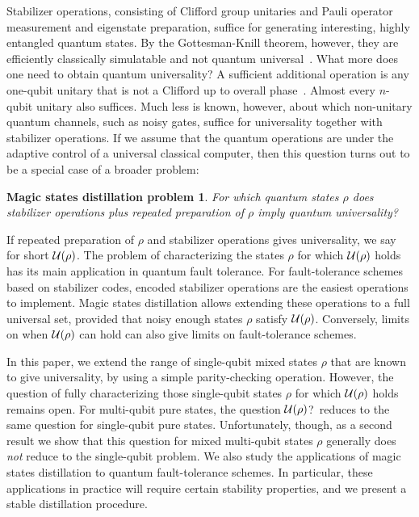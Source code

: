 \documentclass[11pt]{article}
\theoremstyle{note}
\begin{document}
Stabilizer operations, consisting of Clifford group unitaries and Pauli operator measurement and eigenstate preparation, suffice for generating interesting, highly entangled quantum states.  By the Gottesman-Knill theorem, however, they are efficiently classically simulatable and not quantum universal~\cite{AaronsonGottesman04}.  What more does one need to obtain quantum universality?  A sufficient additional operation is any one-qubit unitary that is not a Clifford up to overall phase~\cite{Shi02}.  Almost every $n$-qubit unitary also suffices.  Much less is known, however, about which non-unitary quantum channels, such as noisy gates, suffice for universality together with stabilizer operations.  If we assume that the quantum operations are under the adaptive control of a universal classical computer, then this question turns out to be a special case of a broader problem: 
 
\newtheorem*{mstatesdistillationproblem}{Magic states distillation problem}
\begin{mstatesdistillationproblem}
For which quantum states $\rho$ does stabilizer operations plus repeated preparation of $\rho$ imply quantum universality?
\end{mstatesdistillationproblem}

If repeated preparation of $\rho$ and stabilizer operations gives universality, we say for short $\mathcal{U}(\rho)$.  The problem of characterizing the states $\rho$ for which $\mathcal{U}(\rho)$ holds has its main application in quantum fault tolerance.  For fault-tolerance schemes based on stabilizer codes, encoded stabilizer operations are the easiest operations to implement.  Magic states distillation allows extending these operations to a full universal set, provided that noisy enough states $\rho$ satisfy $\mathcal{U}(\rho)$.  Conversely, limits on when $\mathcal{U}(\rho)$ can hold can also give limits on fault-tolerance schemes.  

In this paper, we extend the range of single-qubit mixed states $\rho$ that are known to give universality, by using a simple parity-checking operation.  However, the question of fully characterizing those single-qubit states $\rho$ for which $\mathcal{U}(\rho)$ holds remains open.  For multi-qubit pure states, the question $\mathcal{U}(\rho)$?\ reduces to the same question for single-qubit pure states.  Unfortunately, though, as a second result we show that this question for mixed multi-qubit states $\rho$ generally does \emph{not} reduce to the single-qubit problem.  We also study the applications of magic states distillation to quantum fault-tolerance schemes.  In particular, these applications in practice will require certain stability properties, and we present a stable distillation procedure.  
\end{document}
